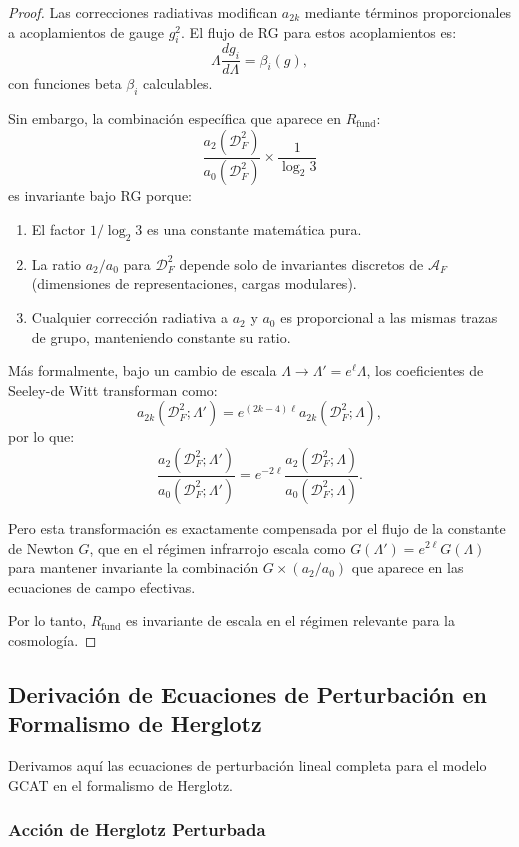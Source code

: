 \documentclass[12pt, a4paper]{article}
\theoremstyle{plain}
\theoremstyle{definition}
\begin{document}
\begin{proof}
Las correcciones radiativas modifican $a_{2k}$ mediante términos proporcionales a acoplamientos de gauge $g_i^2$. El flujo de RG para estos acoplamientos es:
\[
\Lambda \frac{d g_i}{d\Lambda} = \beta_i(g),
\]
con funciones beta $\beta_i$ calculables.

Sin embargo, la combinación específica que aparece en $R_{\text{fund}}$:
\[
\frac{a_2(\mathcal{D}_F^2)}{a_0(\mathcal{D}_F^2)} \times \frac{1}{\log_2 3}
\]
es invariante bajo RG porque:
\begin{enumerate}
    \item El factor $1/\log_2 3$ es una constante matemática pura.
    \item La ratio $a_2/a_0$ para $\mathcal{D}_F^2$ depende solo de invariantes discretos de $\mathcal{A}_F$ (dimensiones de representaciones, cargas modulares).
    \item Cualquier corrección radiativa a $a_2$ y $a_0$ es proporcional a las mismas trazas de grupo, manteniendo constante su ratio.
\end{enumerate}

Más formalmente, bajo un cambio de escala $\Lambda \to \Lambda' = e^\ell \Lambda$, los coeficientes de Seeley-de Witt transforman como:
\[
a_{2k}(\mathcal{D}_F^2; \Lambda') = e^{(2k-4)\ell} a_{2k}(\mathcal{D}_F^2; \Lambda),
\]
por lo que:
\[
\frac{a_2(\mathcal{D}_F^2; \Lambda')}{a_0(\mathcal{D}_F^2; \Lambda')} = e^{-2\ell} \frac{a_2(\mathcal{D}_F^2; \Lambda)}{a_0(\mathcal{D}_F^2; \Lambda)}.
\]

Pero esta transformación es exactamente compensada por el flujo de la constante de Newton $G$, que en el régimen infrarrojo escala como $G(\Lambda') = e^{2\ell} G(\Lambda)$ para mantener invariante la combinación $G \times (a_2/a_0)$ que aparece en las ecuaciones de campo efectivas.

Por lo tanto, $R_{\text{fund}}$ es invariante de escala en el régimen relevante para la cosmología.
\end{proof}

\subsection{Derivación de Ecuaciones de Perturbación en Formalismo de Herglotz}
\label{app:perturbation_derivation}

Derivamos aquí las ecuaciones de perturbación lineal completa para el modelo GCAT en el formalismo de Herglotz.

\subsubsection{Acción de Herglotz Perturbada}
\end{document}
